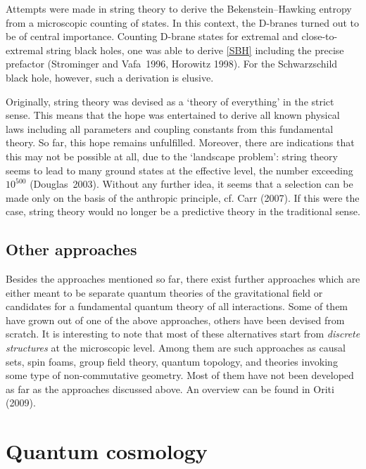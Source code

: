 \documentclass[12pt]{article}
\begin{document}
Attempts were made in string theory to derive the Bekenstein--Hawking
entropy from a microscopic counting of states. In this context, the
D-branes turned out to be of central importance. Counting D-brane
states for extremal and close-to-extremal string black holes, one was
able to derive \eqref{SBH} including the precise prefactor
(Strominger and Vafa~1996, Horowitz 1998). For the Schwarzschild black
hole, however, such a derivation is elusive.

Originally, string theory was devised as a `theory of everything' in
the strict sense. This means that the hope was entertained to derive
all known physical laws including all parameters and coupling
constants from this fundamental theory. So far, this hope remains
unfulfilled. Moreover, there are indications that this may not be
possible at all, due to the `landscape problem': string theory
seems to lead to many ground states at the effective level, the number
exceeding $10^{500}$ (Douglas~2003). Without any further idea, it
seems that a selection can be made only on the basis of the anthropic
principle, cf. Carr (2007). If this were the case, string theory would no longer
be a predictive theory in the traditional sense. 


\subsection{Other approaches}

Besides the approaches mentioned so far, there exist further
approaches which are either meant to be separate quantum theories of
the gravitational field or candidates for a fundamental quantum theory
of all interactions. Some of them have grown out of one of the above
approaches, others have been devised from scratch. It is interesting
to note that most of these alternatives start from {\em discrete
  structures} at the microscopic level. Among them are such approaches
as causal sets, spin foams, group field theory, quantum topology, and
theories invoking some type of non-commutative geometry. Most of them
have not been developed as far as the approaches discussed above. An
overview can be found in Oriti (2009). 


\section{Quantum cosmology}
\end{document}
